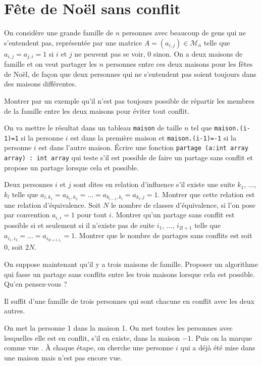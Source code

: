 \renewcommand{\SourceFile}{5-graphes/src/5-1.ml}

\section{Fête de Noël sans conflit}

On considère une grande famille de $n$ personnes avec beaucoup de gens qui ne s'entendent pas, représentée par une matrice $A=(a_{i,j})\in \mathscr{M}_n$ telle que $a_{i,j}=a_{j,i}=1$ si $i$ et $j$ ne peuvent pas se voir, 0 sinon. On a deux maisons de famille et on veut partager les $n$ personnes entre ces deux maisons pour les fêtes de Noël, de façon que deux personnes qui ne s'entendent pas soient toujours dans des maisons différentes.

\Q
Montrer par un exemple qu'il n'est pas toujours possible de répartir les membres de la famille entre les deux maisons pour éviter tout conflit.

\Q
On va mettre le résultat dans un tableau \texttt{maison} de taille $n$ tel que \texttt{maison.(i-1)=1} si la personne $i$ est dans la première maison et \texttt{maison.(i-1)=-1} si la personne $i$ est dans l'autre maison. Écrire une fonction \texttt{partage (a:int array array) : int array} qui teste s'il est possible de faire un partage sans conflit et propose un partage lorsque cela et possible.

\Q
Deux personnes $i$ et $j$ sont dites en relation d'influence s'il existe une suite $k_1$, ..., $k_l$ telle que $a_{i,k_1}=a_{k_1,k_2}=...=a_{k_{l-1},k_l}=a_{k_l,j}=1$. Montrer que cette relation est une relation d'équivalence. Soit $N$ le nombre de classes d'équivalence, si l'on pose par convention $a_{i,i}=1$ pour tout $i$. Montrer qu'un partage sans conflit est possible si et seulement si il n'existe pas de suite $i_1$, ..., $i_{2l+1}$ telle que $a_{i_1,i_2}=...=a_{i_{2l+1,i_1}}=1$. Montrer que le nombre de partages sans conflits est soit 0, soit $2N$.

\Q
On suppose maintenant qu'il y a trois maisons de famille. Proposer un algorithme qui fasse un partage sans conflits entre les trois maisons lorsque cela est possible. Qu'en pensez-vous ?

\Corrige

\Q
Il suffit d'une famille de trois personnes qui sont chacune en conflit avec les deux autres.

\Q
On met la personne 1 dans la maison 1. On met toutes les personnes avec lesquelles elle est en conflit, s'il en existe, dans la maison $-1$. Puis on la marque comme \og vue \fg{}. À chaque étape, on cherche une personne $i$ qui a déjà été mise dans une maison mais n'est pas encore vue.
\medskip


